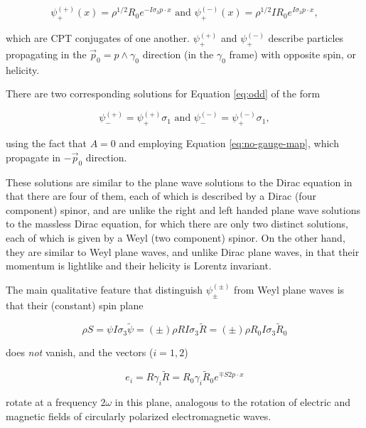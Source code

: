 \documentclass{article}
\begin{document}
  \begin{equation}
    \psi^{(+)}_+(x) = \rho^{1/2} R_0 e^{- I \sigma_3 p \cdot x} \text { and } \psi^{(-)}_+(x) = \rho^{1/2} I R_0 e^{I \sigma_3 p \cdot x},
  \end{equation} 

  which are CPT conjugates of one another. $\psi^{(+)}_+$ and $\psi^{(-)}_+$ describe particles propagating in the $\vec p_0 = p \wedge \gamma_0$ direction (in the $\gamma_0$ frame) with opposite spin, or helicity.

  There are two corresponding solutions for Equation \ref{eq:odd} of the form

  \begin{equation}
    \psi^{(+)}_- = \psi^{(+)}_+ \sigma_1 \text{ and }
    \psi^{(-)}_- = \psi^{(-)}_+ \sigma_1,
  \end{equation}

  using the fact that $A=0$ and employing Equation \ref{eq:no-gauge-map}, which propagate in $-\vec p_0$ direction.

  These solutions are similar to the plane wave solutions to the Dirac equation in that there are four of them, each of which is described by a Dirac (four component) spinor, and are unlike the right and left handed plane wave solutions to the massless Dirac equation, for which there are only two distinct solutions, each of which is given by a Weyl (two component) spinor. On the other hand, they are similar to Weyl plane waves, and unlike Dirac plane waves, in that their momentum is lightlike and their helicity is Lorentz invariant.

  The main qualitative feature that distinguish $\psi^{(\pm)}_{\pm}$ from Weyl plane waves is that their (constant) spin plane 

  \begin{equation}
    \rho S = \psi I \sigma_3 \widetilde \psi = (\pm) \rho  R I \sigma_3 \widetilde R = (\pm) \rho R_0 I \sigma_3 \widetilde R_0
  \end{equation}

  does \emph{not} vanish, and the vectors ($i = 1, 2$)

  \begin{equation}
    e_i = R \gamma_i \widetilde R = R_0 \gamma_i \widetilde R_0 e^{\mp S 2 p \cdot x}
  \end{equation} 

  rotate at a frequency $2 \omega$ in this plane, analogous to the rotation of electric and magnetic fields of circularly polarized electromagnetic waves.
\end{document}
